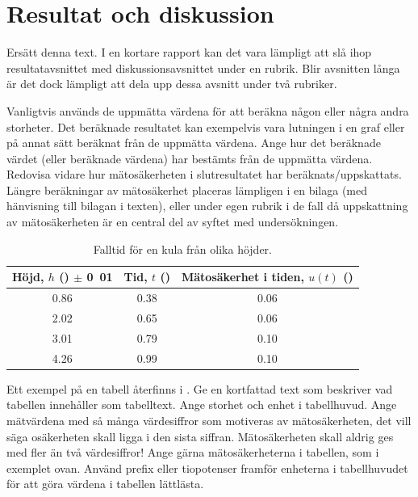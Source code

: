 \documentclass[a4paper,nologo]{miunart} %
\begin{document}
\section{Resultat och diskussion}
\label{sec:results}
Ersätt denna text.
I en kortare rapport kan det vara lämpligt att slå ihop resultatavsnittet med 
diskussionsavsnittet under en rubrik.
Blir avsnitten långa är det dock lämpligt att dela upp dessa avsnitt under två 
rubriker.

Vanligtvis används de uppmätta värdena för att beräkna någon eller några andra 
storheter.
Det beräknade resultatet kan exempelvis vara lutningen i en graf eller på annat 
sätt beräknat från de uppmätta värdena.
Ange hur det beräknade värdet (eller beräknade värdena) har bestämts från de 
uppmätta värdena.
Redovisa vidare hur mätosäkerheten i slutresultatet har beräknats/uppskattats.
Längre beräkningar av mätosäkerhet placeras lämpligen i en bilaga (med 
hänvisning till bilagan i texten), eller under egen rubrik i de fall då 
uppskattning av mätosäkerheten är en central del av syftet med undersökningen.

\begin{table}
	\centering
	\begin{tabular}{ccc}
		\hline\hline
		\textbf{Höjd, \(h\) (\metre) \(\pm\) \unit{0.01}{\metre}} &
		\textbf{Tid, \(t\) (\second)} &
		\textbf{Mätosäkerhet i tiden, \(u(t)\) (\second)} \\
		\hline
		0.86 &	0.38 &	0.06 \\
		2.02 &	0.65 &	0.06 \\
		3.01 &	0.79 &	0.10 \\
		4.26 &	0.99 &	0.10 \\
		\hline\hline
	\end{tabular}
	\caption{Falltid för en kula från olika höjder.}
	\label{tab:kula}
\end{table}

Ett exempel på en tabell återfinns i .
Ge en kortfattad text som beskriver vad tabellen innehåller som tabelltext.
Ange storhet och enhet i tabellhuvud.
Ange mätvärdena med så många värdesiffror som motiveras av mätosäkerheten, det 
vill säga osäkerheten skall ligga i den sista siffran.
Mätosäkerheten skall aldrig ges med fler än två värdesiffror!
Ange gärna mätosäkerheterna i tabellen, som i exemplet ovan.
Använd prefix eller tiopotenser framför enheterna i tabellhuvudet för att göra 
värdena i tabellen lättlästa.
\end{document}
